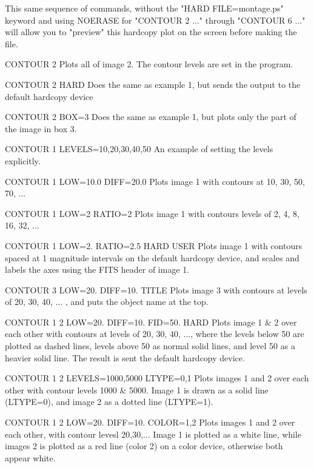 This same sequence of commands, without the "HARD FILE=montage.ps" keyword
and using NOERASE for "CONTOUR 2 ..." through "CONTOUR 6 ..." will allow
you to "preview" this hardcopy plot on the screen before making the file.
 
\begin{example}
  \item[CONTOUR 2\hfill]{
Plots all of image 2.  The contour levels are set in the program.}
  \item[CONTOUR 2 HARD\hfill]{
Does the same as example 1, but sends the output to the default
        hardcopy device}
  \item[CONTOUR 2 BOX=3\hfill]{
Does the same as example 1, but plots only the part of the image in
box 3.}
  \item[CONTOUR 1 LEVELS=10,20,30,40,50\hfill]{
An example of setting the levels explicitly.}
  \item[CONTOUR 1 LOW=10.0 DIFF=20.0\hfill]{
Plots image 1 with contours at 10, 30, 50, 70, ...}
  \item[CONTOUR 1 LOW=2 RATIO=2\hfill]{
Plots image 1 with contours levels of 2, 4, 8, 16, 32, ...}
  \item[CONTOUR 1 LOW=2. RATIO=2.5 HARD USER\hfill]{
Plots image 1 with contours spaced at 1 magnitude intervals on the
default hardcopy device, and scales and labels the axes using the
FITS header of image 1.}
  \item[CONTOUR 3 LOW=20. DIFF=10. TITLE\hfill]{
Plots image 3 with contours at levels of 20, 30, 40, ... , and puts
the object name at the top.}
  \item[CONTOUR 1 2 LOW=20. DIFF=10. FID=50. HARD\hfill]{
        Plots image 1 \& 2 over each other with contours at levels of 20, 30, 
        40, ..., where the levels below 50 are plotted as dashed lines, 
        levels above 50 as normal solid lines, and level 50 as a heavier 
        solid line. The result is sent the default hardcopy device.}
  \item[CONTOUR 1 2 LEVELS=1000,5000 LTYPE=0,1 \hfill]{
        Plots images 1 and 2 over each other with contour levels 1000 \& 5000.
        Image 1 is drawn as a solid line (LTYPE=0), and image 2 as a dotted 
        line (LTYPE=1).}
  \item[CONTOUR 1 2 LOW=20. DIFF=10. COLOR=1,2\hfill]{
Plots images 1 and 2 over each other, with contour levesl 20,30,...
        Image 1 is plotted as a white line, while images 2 is plotted as
        a red line (color 2) on a color device, otherwise both appear white.}

\end{example}

